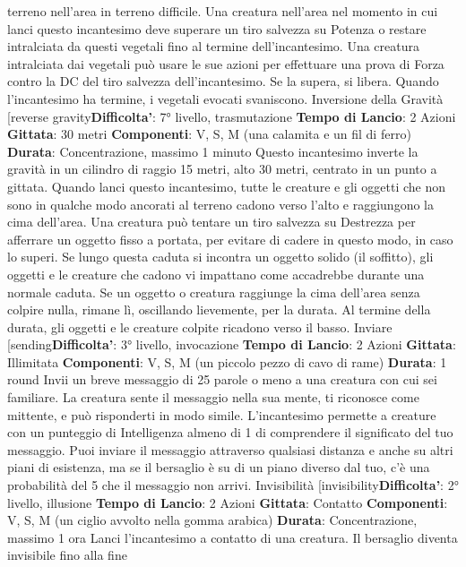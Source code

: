 \begin{multicols}{2}
terreno nell’area in terreno difficile.
Una creatura nell’area nel momento in cui lanci questo
incantesimo deve superare un tiro salvezza su Potenza o
restare intralciata da questi vegetali fino al termine
dell’incantesimo. Una creatura intralciata dai vegetali
può usare le sue azioni per effettuare una prova di
Forza contro la DC del tiro salvezza dell’incantesimo.
Se la supera, si libera.
Quando l’incantesimo ha termine, i vegetali evocati
svaniscono.
Inversione della Gravità
[reverse gravity\textbf{Difficolta'}:
7° livello, trasmutazione
\textbf{Tempo di Lancio}: 2 Azioni
\textbf{Gittata}: 30 metri
\textbf{Componenti}: V, S, M (una calamita e un fil di ferro)
\textbf{Durata}: Concentrazione, massimo 1 minuto
Questo incantesimo inverte la gravità in un cilindro di
raggio 15 metri, alto 30 metri, centrato in un punto a
gittata. Quando lanci questo incantesimo, tutte le
creature e gli oggetti che non sono in qualche modo
ancorati al terreno cadono verso l’alto e raggiungono la
cima dell’area. Una creatura può tentare un tiro
salvezza su Destrezza per afferrare un oggetto fisso a
portata, per evitare di cadere in questo modo, in caso lo
superi.
Se lungo questa caduta si incontra un oggetto solido (il
soffitto), gli oggetti e le creature che cadono vi
impattano come accadrebbe durante una normale
caduta. Se un oggetto o creatura raggiunge la cima
dell’area senza colpire nulla, rimane lì, oscillando
lievemente, per la durata.
Al termine della durata, gli oggetti e le creature colpite
ricadono verso il basso.
Inviare
[sending\textbf{Difficolta'}:
3° livello, invocazione
\textbf{Tempo di Lancio}: 2 Azioni
\textbf{Gittata}: Illimitata
\textbf{Componenti}: V, S, M (un piccolo pezzo di cavo di
rame)
\textbf{Durata}: 1 round
Invii un breve messaggio di 25 parole o meno a una
creatura con cui sei familiare. La creatura sente il
messaggio nella sua mente, ti riconosce come mittente,
e può risponderti in modo simile. L’incantesimo
permette a creature con un punteggio di Intelligenza
almeno di 1 di comprendere il significato del tuo
messaggio.
Puoi inviare il messaggio attraverso qualsiasi distanza e
anche su altri piani di esistenza, ma se il bersaglio è su
di un piano diverso dal tuo, c’è una probabilità del 5%
che il messaggio non arrivi.
Invisibilità
[invisibility\textbf{Difficolta'}:
2° livello, illusione
\textbf{Tempo di Lancio}: 2 Azioni
\textbf{Gittata}: Contatto
\textbf{Componenti}: V, S, M (un ciglio avvolto nella gomma
arabica)
\textbf{Durata}: Concentrazione, massimo 1 ora
Lanci l’incantesimo a contatto di una creatura. Il
bersaglio diventa invisibile fino alla fine

\end{multicols}
